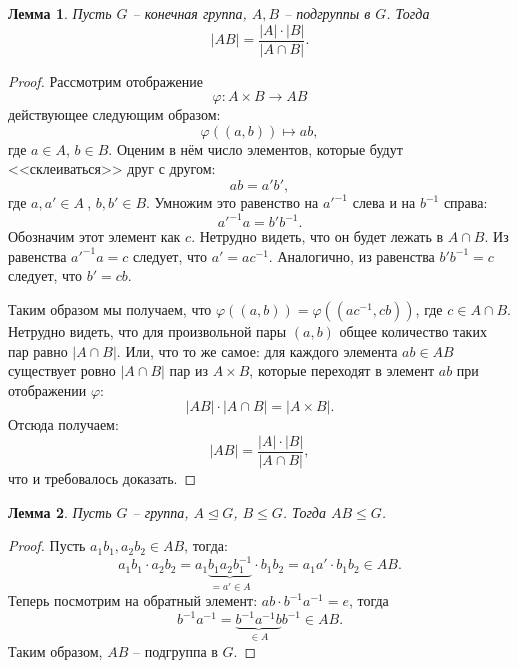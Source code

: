 \documentclass{article}
\newtheorem{lemma}{Лемма}[section]
\begin{document}
\begin{lemma} \label{efiopia}
    Пусть $G$ -- конечная группа, $A, B$ -- подгруппы в $G$. Тогда $$ |AB| = \frac{|A| \cdot |B|}{|A \cap B|}. $$
\end{lemma}
\begin{proof}
    Рассмотрим отображение $$\varphi: A \times B \rightarrow AB$$ действующее следующим образом: $$ \varphi((a, b)) \mapsto ab, $$ где $a \in A$, $b \in B$.
    Оценим в нём число элементов, которые будут <<склеиваться>> друг с другом: $$ ab = a'b', $$ где $a, a' \in A \ $, $b,b' \in B$. Умножим это равенство на ${a'}^{-1}$ слева и на $b^{-1}$ справа: $$ {a'}^{-1}a = b' b^{-1}. $$ Обозначим этот элемент как $c$. Нетрудно видеть, что он будет лежать в $A \cap B$.
    Из равенства ${a'}^{-1}a = c$ следует, что $a' = a c^{-1}$. Аналогично, из равенства $b' b^{-1} = c$ следует, что $b' = cb$.
    
    Таким образом мы получаем, что $\varphi((a, b)) = \varphi((ac^{-1}, cb))$, где $c \in A \cap B$. Нетрудно видеть, что для произвольной пары $(a, b)$ общее количество таких пар равно $|A \cap B|$. Или, что то же самое: для каждого элемента $ab \in AB$ существует ровно $|A \cap B|$ пар из $A \times B$, которые переходят в элемент $ab$ при отображении $\varphi$: $$ |AB| \cdot |A \cap B| = |A \times B|. $$ Отсюда получаем: $$ |AB| = \frac{|A| \cdot |B|}{|A \cap B|}, $$ что и требовалось доказать.
\end{proof}

\begin{lemma} \label{rafah}
    Пусть $G$ -- группа, $A \trianglelefteq G$, $B \leqslant G$. Тогда $AB \leqslant G$.
\end{lemma}
\begin{proof}
    Пусть $a_1 b_1, a_2 b_2 \in AB$, тогда:
    \[
        a_1 b_1 \cdot a_2 b_2 = a_1 \underbrace{b_1 a_2 b_1^{-1}}_{= a' \in A} \cdot b_1 b_2 = a_1 a' \cdot b_1 b_2 \in AB.
    \]
    Теперь посмотрим на обратный элемент: $ab \cdot b^{-1} a^{-1} = e$, тогда $$ b^{-1} a^{-1} = \underbrace{b^{-1} a^{-1} b}_{\in A} b^{-1} \in AB. $$
    Таким образом, $AB$ -- подгруппа в $G$.
\end{proof}
\end{document}
